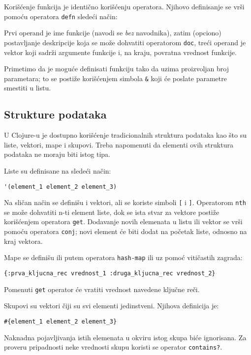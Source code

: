 Korišćenje funkcija je identično korišćenju operatora. Njihovo definisanje se vrši pomoću operatora \texttt{defn} sledeći način:



Prvi operand je ime funkcije (navodi se \emph{bez} navodnika), zatim (opciono) postavljanje deskripcije koja se može dohvatiti operatorom \texttt{doc}, treći operand je vektor koji sadrži argumente funkcije i, na kraju, povratna vrednost funkcije.

Primetimo da je moguće definisati funkciju tako da uzima proizvoljan broj parametara; to se postiže korišćenjem simbola \texttt{\&} koji će poslate parametre smestiti u listu.

\subsection{Strukture podataka}
\label{strukturepodataka}

U Clojure-u je dostupno korišćenje tradicionalnih struktura podataka kao što su liste, vektori, mape i skupovi.  Treba napomenuti da elementi ovih struktura podataka ne moraju biti istog tipa.

Liste su definisane na sledeći način:

\begin{verbatim}
'(element_1 element_2 element_3)
\end{verbatim}

Na sličan način se definišu i vektori, ali se koriste simboli \texttt{[} i \texttt{]}. Operatorom \texttt{nth} se može dohvatiti n-ti element liste, dok se ista stvar za vektore postiže korišćenjem operatora \texttt{get}. Dodavanje novih elemenata u listu ili vektor se vrši pomoću operatora \texttt{conj}; novi element će biti dodat na početak liste, odnosno na kraj vektora.

Mape se definišu ili putem operatora \texttt{hash-map} ili uz pomoć vitičastih zagrada:

\begin{verbatim}
{:prva_kljucna_rec vrednost_1 :druga_kljucna_rec vrednost_2}
\end{verbatim}

Pomenuti \texttt{get} operator će vratiti vrednost navedene ključne reči.

Skupovi su vektori čiji su svi elementi jedinstveni. Njihova definicija je:

\begin{verbatim}
#{element_1 element_2 element_3}
\end{verbatim}

Naknadna pojavljivanja istih elemenata u okviru istog skupa biće ignorisana. Za proveru pripadnosti neke vrednosti skupu koristi se operator \texttt{contains?}.